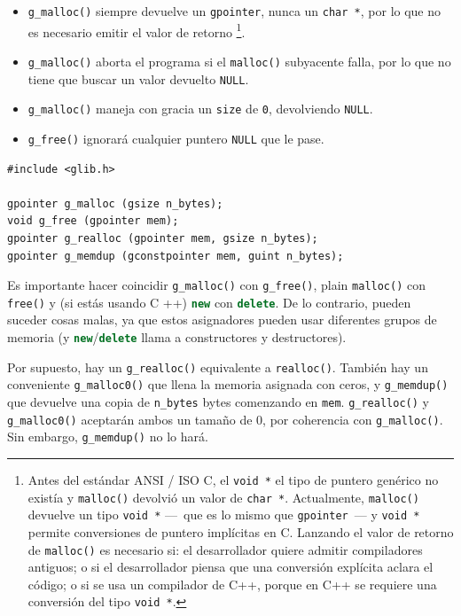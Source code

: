 \begin{itemize}
    \item \lstinline{g_malloc()} siempre devuelve un \lstinline{gpointer}, nunca un \lstinline{char *}, por lo que no es necesario emitir el valor de retorno \footnote{Antes del estándar ANSI / ISO C, el \lstinline{void *} el tipo de puntero genérico no existía y \lstinline{malloc()} devolvió un valor de \lstinline{char *}. Actualmente, \lstinline{malloc()} devuelve un tipo \lstinline{void *} ---~que es lo mismo que \lstinline{gpointer}~--- y \lstinline{void *} permite conversiones de puntero implícitas en C. Lanzando el valor de retorno de \lstinline{malloc()} es necesario si: el desarrollador quiere admitir compiladores antiguos; o si el desarrollador piensa que una conversión explícita aclara el código; o si se usa un compilador de C++, porque en C++ se requiere una conversión del tipo \lstinline{void *}.}.
    
    \item \lstinline{g_malloc()} aborta el programa si el \lstinline{malloc()} subyacente falla, por lo que no tiene que buscar un valor devuelto \lstinline{NULL}.
    
    \item \lstinline{g_malloc()} maneja con gracia un \lstinline{size} de \lstinline{0}, devolviendo \lstinline{NULL}.
    
    \item \lstinline{g_free()} ignorará cualquier puntero \lstinline{NULL} que le pase.
\end{itemize}

\begin{lstlisting}[float, caption={GLib memory allocation}, label=glib-malloc-free]
#include <glib.h>

gpointer g_malloc (gsize n_bytes);
void g_free (gpointer mem);
gpointer g_realloc (gpointer mem, gsize n_bytes);
gpointer g_memdup (gconstpointer mem, guint n_bytes);
\end{lstlisting}

Es importante hacer coincidir \lstinline{g_malloc()} con \lstinline{g_free()}, plain \lstinline{malloc()} con \lstinline{free()} y (si estás usando C ++) \lstinline[language=C++]{new} con \lstinline[language=C++]{delete}. De lo contrario, pueden suceder cosas malas, ya que estos asignadores pueden usar diferentes grupos de memoria (y \lstinline[language=C++]{new}/\lstinline[language=C++]{delete} llama a constructores y destructores).

Por supuesto, hay un \lstinline{g_realloc()} equivalente a \lstinline{realloc()}. También hay un conveniente \lstinline{g_malloc0()} que llena la memoria asignada con ceros, y \lstinline{g_memdup()} que devuelve una copia de \lstinline{n_bytes} bytes comenzando en \lstinline{mem}. \lstinline{g_realloc()} y \lstinline{g_malloc0()} aceptarán ambos un tamaño de 0, por coherencia con \lstinline{g_malloc()}. Sin embargo, \lstinline{g_memdup()} no lo hará.

